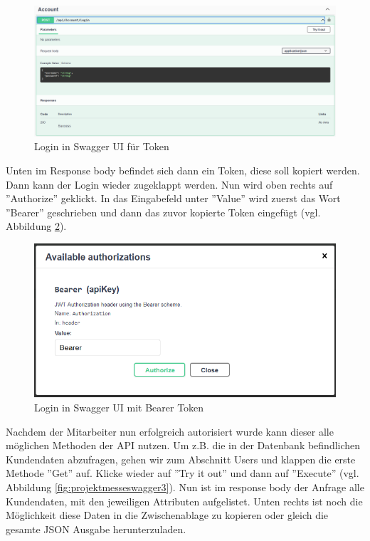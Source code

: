 \begin{figure}[h]
	\centering
	\includegraphics[width=0.9\linewidth]{Images/Projekt_Messe_Swagger1}
	\caption{Login in Swagger UI für Token}
	\label{fig:projektmesseswagger1}
\end{figure}

Unten im Response body befindet sich dann ein Token, diese soll kopiert werden. Dann kann der Login wieder zugeklappt werden. Nun wird oben rechts auf ''Authorize'' geklickt. In das Eingabefeld unter ''Value'' wird zuerst das Wort ''Bearer'' geschrieben und dann das zuvor kopierte Token eingefügt (vgl. Abbildung \ref{fig:projektmesseswagger2}).

\begin{figure}[h]
	\centering
	\includegraphics[width=0.7\linewidth]{Images/Projekt_Messe_Swagger2}
	\caption{Login in Swagger UI mit Bearer Token}
	\label{fig:projektmesseswagger2}
\end{figure}

Nachdem der Mitarbeiter nun erfolgreich autorisiert wurde kann dieser alle möglichen Methoden der API nutzen. Um z.B. die in der Datenbank befindlichen Kundendaten abzufragen, gehen wir zum Abschnitt Users und klappen die erste Methode ''Get'' auf. Klicke wieder auf ''Try it out'' und dann auf ''Execute'' (vgl. Abbildung \ref{fig:projektmesseswagger3}). Nun ist im response body der Anfrage alle Kundendaten, mit den jeweiligen Attributen aufgelistet. Unten rechts ist noch die Möglichkeit diese Daten in die Zwischenablage zu kopieren oder gleich die gesamte JSON Ausgabe herunterzuladen.

